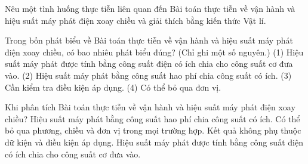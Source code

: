 \begin{bt}
Nêu một tình huống thực tiễn liên quan đến Bài toán thực tiễn về vận hành và hiệu suất máy phát điện xoay chiều và giải thích bằng kiến thức Vật lí.
\end{bt}

\begin{ex}
Trong bốn phát biểu về Bài toán thực tiễn về vận hành và hiệu suất máy phát điện xoay chiều, có bao nhiêu phát biểu đúng? (Chỉ ghi một số nguyên.) (1) Hiệu suất máy phát được tính bằng công suất điện có ích chia cho công suất cơ đưa vào. (2) Hiệu suất máy phát bằng công suất hao phí chia công suất có ích. (3) Cần kiểm tra điều kiện áp dụng. (4) Có thể bỏ qua đơn vị.
\end{ex}

\begin{ex}
Khi phân tích Bài toán thực tiễn về vận hành và hiệu suất máy phát điện xoay chiều?
\choice
{Hiệu suất máy phát bằng công suất hao phí chia công suất có ích.}
{Có thể bỏ qua phương, chiều và đơn vị trong mọi trường hợp.}
{Kết quả không phụ thuộc dữ kiện và điều kiện áp dụng.}
{\True Hiệu suất máy phát được tính bằng công suất điện có ích chia cho công suất cơ đưa vào.}
\end{ex}

